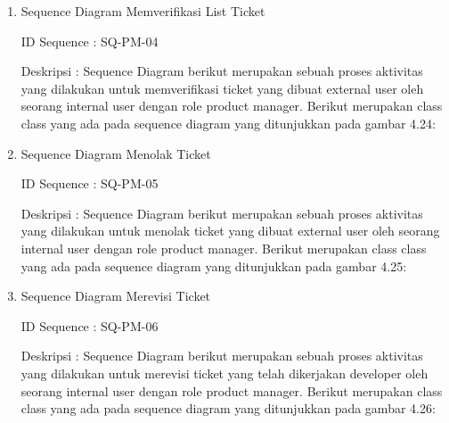 \documentclass[12pt]{article}
\begin{document}
\begin{enumerate}[label=\textbf{4.\arabic*.}]
\begin{enumerate}[label=\textbf{4.1.\arabic*.}, wide, labelwidth=!, labelindent=0pt]
\begin{enumerate}[label=\textbf{4.1.7.\arabic*.}, wide, labelwidth=!, labelindent=0pt]
\begin{enumerate}[label=\arabic*.]
                \item Sequence Diagram Memverifikasi List Ticket
                
                \noindent ID Sequence	: SQ-PM-04
                
                \noindent Deskripsi	: Sequence Diagram berikut merupakan sebuah proses aktivitas yang dilakukan untuk memverifikasi ticket yang dibuat external user oleh seorang internal user dengan role product manager. Berikut merupakan class class yang ada pada sequence diagram yang ditunjukkan pada gambar 4.24:
                
                
                \item Sequence Diagram Menolak Ticket
                
                \noindent ID Sequence	: SQ-PM-05
                
                \noindent Deskripsi	: Sequence Diagram berikut merupakan sebuah proses aktivitas yang dilakukan untuk menolak ticket yang dibuat external user oleh seorang internal user dengan role product manager. Berikut merupakan class class yang ada pada sequence diagram yang ditunjukkan pada gambar 4.25:
                

                \item Sequence Diagram Merevisi Ticket
                
                \noindent ID Sequence	: SQ-PM-06
                
                \noindent Deskripsi	: Sequence Diagram berikut merupakan sebuah proses aktivitas yang dilakukan untuk merevisi ticket yang telah dikerjakan developer oleh seorang internal user dengan role product manager. Berikut merupakan class class yang ada pada sequence diagram yang ditunjukkan pada gambar 4.26:
                

\end{enumerate}
\end{enumerate}
\end{enumerate}
\end{enumerate}
\end{document}
